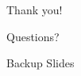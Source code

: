 \documentclass{beamer}
\begin{document}


\begin{frame}{Thank you!}
    \begin{center}
        Questions?
    \end{center}
\end{frame}

\begin{frame}
    \begin{center}
        Backup Slides
    \end{center}
\end{frame}
\end{document}
